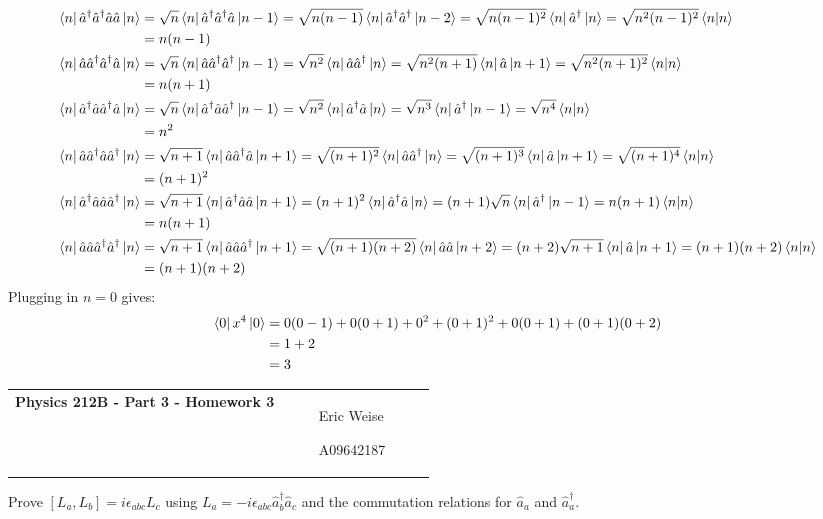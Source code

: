 \documentclass{article}
\newcommand{\assignment}[1]{
    \newpage
    \begin{tabular}{p{0.65\linewidth}p{0.25\linewidth}}
        {\bf\LARGE Physics 212B - Part 3 - Homework #1 }
        &
        \parbox[b]{0.24\textwidth}{
            \hfill Eric Weise

            \hfill A09642187
            }
    \end{tabular}
    \vspace{12pt}
    \newline
}
\renewcommand{\RAISE}[0]{\hat{a}^{\dagger}}
\renewcommand{\LOWER}[0]{\hat{a}}
\begin{document}
\begin{align*}
    \bra{n} \RAISE\RAISE\LOWER\LOWER \ket{n}
        &= \sqrt{n} \bra{n} \RAISE\RAISE\LOWER \ket{n-1}
         = \sqrt{n(n-1)} \bra{n} \RAISE\RAISE \ket{n-2}
         = \sqrt{n(n-1)^2} \bra{n} \RAISE \ket{n}
         = \sqrt{n^2(n-1)^2} \braket{n|n} \\
        &= n(n-1) \\
    \bra{n} \LOWER\RAISE\RAISE\LOWER \ket{n}
        &= \sqrt{n} \bra{n} \LOWER\RAISE\RAISE \ket{n-1}
         = \sqrt{n^2} \bra{n} \LOWER\RAISE \ket{n}
         = \sqrt{n^2(n+1)} \bra{n} \LOWER \ket{n+1}
         = \sqrt{n^2(n+1)^2} \braket{n|n} \\
        &= n(n+1) \\
    \bra{n} \RAISE\LOWER\RAISE\LOWER \ket{n}
        &= \sqrt{n} \bra{n} \RAISE\LOWER\RAISE \ket{n-1}
         = \sqrt{n^2} \bra{n} \RAISE\LOWER \ket{n}
         = \sqrt{n^3} \bra{n} \RAISE \ket{n-1}
         = \sqrt{n^4} \braket{n|n} \\
        &= n^2 \\
    \bra{n} \LOWER\RAISE\LOWER\RAISE \ket{n}
        &= \sqrt{n+1} \bra{n} \LOWER\RAISE\LOWER \ket{n+1}
         = \sqrt{(n+1)^2} \bra{n} \LOWER\RAISE \ket{n}
         = \sqrt{(n+1)^3} \bra{n} \LOWER \ket{n+1}
         = \sqrt{(n+1)^4} \braket{n|n} \\
        &= (n+1)^2 \\
    \bra{n} \RAISE\LOWER\LOWER\RAISE \ket{n}
        &= \sqrt{n+1} \bra{n} \RAISE\LOWER\LOWER \ket{n+1}
         = (n+1)^2 \bra{n} \RAISE\LOWER \ket{n}
         = (n+1)\sqrt{n} \bra{n} \RAISE \ket{n-1}
         = n(n+1) \braket{n|n} \\
        &= n(n+1) \\
    \bra{n} \LOWER\LOWER\RAISE\RAISE \ket{n}
        &= \sqrt{n+1} \bra{n} \LOWER\LOWER\RAISE \ket{n+1}
         = \sqrt{(n+1)(n+2)} \bra{n} \LOWER\LOWER \ket{n+2}
         = (n+2)\sqrt{n+1} \bra{n} \LOWER \ket{n+1}
         = (n+1)(n+2) \braket{n|n} \\
        &= (n+1)(n+2) \\
\end{align*}
Plugging in $n=0$ gives:
\begin{align*}
    \bra{0} x^4 \ket{0}
    &= 0(0-1) + 0(0+1) + 0^2 + (0+1)^2 + 0(0+1) + (0+1)(0+2) \\
    &= 1 + 2 \\
    &= 3
\end{align*}


\assignment{3}
Prove
\( [L_a, L_b] = i \epsilon_{abc} L_c \)
using
\( L_a = -i \epsilon_{abc}\RAISE_b \LOWER_c \)
and the commutation relations for $\LOWER_a$ and $\RAISE_a$.
\end{document}
